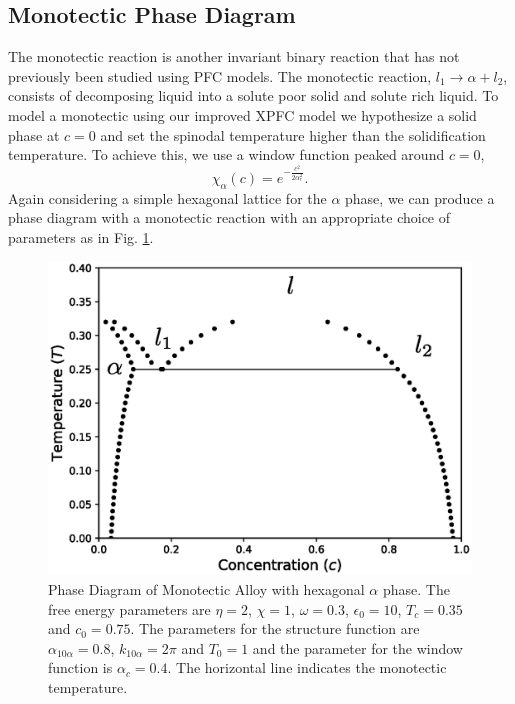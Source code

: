 \documentclass[showkeys, prb, reprint]{revtex4-1}
\newcommand{\f}{\frac}          %
\begin{document}
\subsection{Monotectic Phase Diagram} %

The monotectic reaction is another invariant binary reaction that has not
previously been studied using PFC models. The monotectic reaction, $l_1
\rightarrow \alpha + l_2$, consists of decomposing liquid into a solute poor
solid and solute rich liquid. To model a monotectic using our improved XPFC
model we hypothesize a solid phase at $c=0$ and set the spinodal temperature
higher than the solidification temperature. To achieve this, we use a window
function peaked around $c = 0$,
%
\begin{equation}
    \chi_\alpha(c) = e^{-\f{c^2}{2\alpha_c^2}}.
\end{equation}
%
Again considering a simple hexagonal lattice for the $\alpha$ phase, we can
produce a phase diagram with a monotectic reaction with an appropriate choice
of parameters as in Fig. \ref{monotectic}.

\begin{figure}
	\includegraphics[scale=0.5]{monotectic.eps}
    \caption[Monotectic Phase Diagram]{
        \label{monotectic} Phase Diagram of Monotectic Alloy with hexagonal
        $\alpha$ phase. The free energy parameters are $\eta = 2$, $\chi=1$,
        $\omega=0.3$, $\epsilon_0 = 10$, $T_c = 0.35$ and $c_0 = 0.75$. The
        parameters for the structure function are $\alpha_{10\alpha} = 0.8$,
        $k_{10\alpha} = 2\pi$ and $T_0 = 1$ and the parameter for the window
        function is $\alpha_c = 0.4$. The horizontal line indicates the 
        monotectic temperature.
    }
\end{figure}
\end{document}

